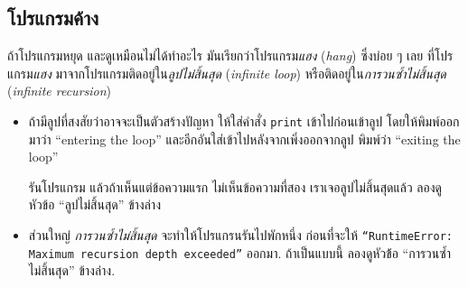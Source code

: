 \subsection{โปรแกรมค้าง}



ถ้าโปรแกรมหยุด และดูเหมือนไม่ได้ทำอะไร
มันเรียกว่าโปรแกรม\textit{แฮง} (\textit{hang})
ซึ่งบ่อย ๆ เลย ที่โปรแกรม\textit{แฮง} มาจากโปรแกรมติดอยู่ใน\textit{ลูปไม่สิ้นสุด} (\textit{infinite loop}) หรือติดอยู่ใน\textit{การวนซ้ำไม่สิ้นสุด} (\textit{infinite recursion})

\begin{itemize}



\item ถ้ามีลูปที่สงสัยว่าอาจจะเป็นตัวสร้างปัญหา
ให้ใส่คำสั่ง \texttt{print} เข้าไปก่อนเข้าลูป โดยให้พิมพ์ออกมาว่า ``entering the loop'' และอีกอันใส่เข้าไปหลังจากเพิ่งออกจากลูป พิมพ์ว่า ``exiting the loop''

%
รันโปรแกรม แล้วถ้าเห็นแต่ข้อความแรก ไม่เห็นข้อความที่สอง เราเจอลูปไม่สิ้นสุดแล้ว ลองดูหัวข้อ ``ลูปไม่สิ้นสุด'' ข้างล่าง


\item ส่วนใหญ่ \textit{การวนซ้ำไม่สิ้นสุด} จะทำให้โปรแกรนรันไปพักหนึ่ง
ก่อนที่จะให้
\texttt{``RuntimeError: Maximum
recursion depth exceeded''} ออกมา.
ถ้าเป็นแบบนี้ ลองดูหัวข้้อ ``การวนซ้ำไม่สิ้นสุด'' ข้างล่าง.



\end{itemize}
